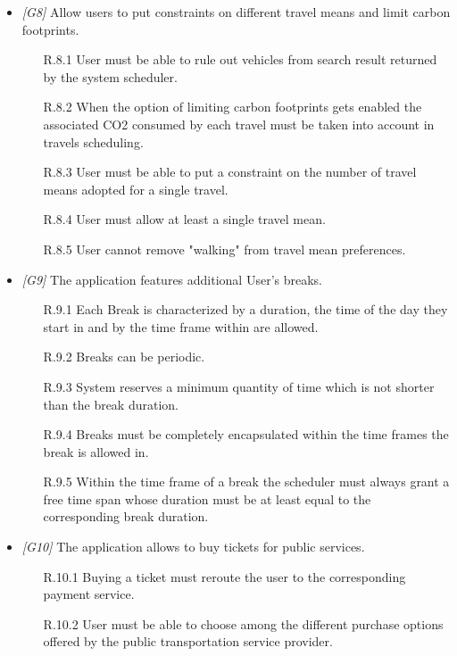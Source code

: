 \begin{itemize}
	\item \textit{[G8]} Allow users to put constraints on different travel means and limit carbon footprints.
		\begin{itemize}
			\item[R.8.1] User must be able to rule out vehicles from search result returned by the system scheduler.
			\item[R.8.2] When the option of limiting carbon footprints gets enabled the associated CO2 consumed by each travel must be taken into account in travels scheduling.
			\item[R.8.3] User must be able to put a constraint on the number of travel means adopted for a single travel.			\item[R.8.4] User must allow at least a single travel mean.
			\item[R.8.5] User cannot remove "walking" from travel mean preferences.
		\end{itemize}


	\item \textit{[G9]} The application features additional User’s breaks.
		\begin{itemize}
			\item [R.9.1] Each Break is characterized by a duration, the time of the day they start in and by the time frame within are allowed.
			\item[R.9.2] Breaks can be periodic.
			\item[R.9.3] System reserves a minimum quantity of time which is not shorter than the break duration.
			\item[R.9.4] Breaks must be completely encapsulated within the time frames the break is allowed in.
			\item[R.9.5] Within the time frame of a break the scheduler must always grant a free time span whose duration must be at least equal to the corresponding break duration.
		\end{itemize}
			


	\item \textit{[G10]} The application allows to buy tickets for public services.
		\begin{itemize}
			\item[R.10.1] Buying a ticket must reroute the user to the corresponding payment service.
			\item[R.10.2] User must be able to choose among the different purchase options offered by the public transportation service provider.
		\end{itemize}



\end{itemize}
